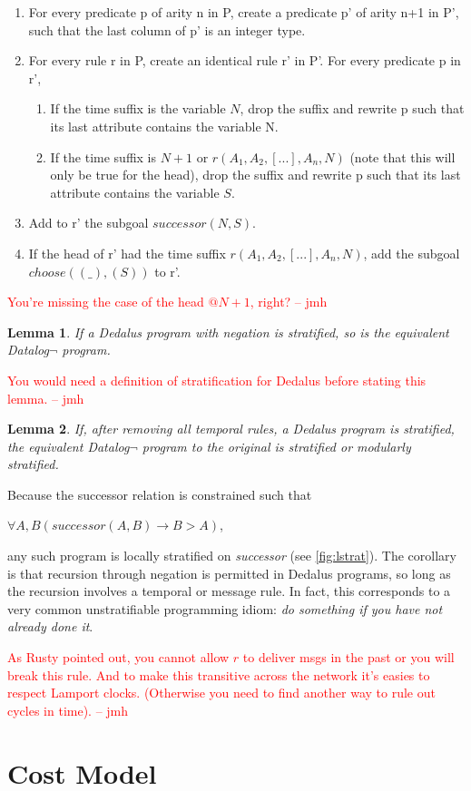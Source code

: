 \documentclass{acm_proc_article-sp-sigmod09}
\newcommand{\jmh}[1]{{\textcolor{red}{#1 -- jmh}}}
\begin{document}
\begin{enumerate}
\item For every predicate p of arity n in P, create a predicate p' of arity n+1 in P', such that the last column of p' is an integer type.
\item For every rule r in P, create an identical rule r' in P'.  For every predicate p in r',  
\begin{enumerate}
	\item If the time suffix is the variable $N$, drop the suffix and rewrite p such that its last attribute contains the variable N.
	\item If the time suffix is $N+1$ or $r(A_{1}, A_{2},[...], A_{n},N)$ (note that this will only be true for the head), drop the suffix
	and rewrite p such that its last attribute contains the variable $S$.
\end{enumerate}
\item Add to r' the subgoal $successor(N, S)$.
\item If the head of r' had the time suffix  $r(A_{1}, A_{2},[...], A_{n},N)$, add the subgoal $choose((\_), (S))$ to r'.

\end{enumerate}
\jmh{You're missing the case of the head $@N+1$, right?}

\newtheorem{lemma}{Lemma}
\begin{lemma}
If a Dedalus program with negation is stratified, so is the equivalent Datalog$\lnot$ program.
\end{lemma}
\jmh{You would need a definition of stratification for Dedalus before stating this lemma.}

\begin{lemma}
If, after removing all temporal rules, a Dedalus program is stratified, the equivalent Datalog$\lnot$ program to the original
is stratified or modularly stratified.
\end{lemma}

 Because the successor relation is constrained
such that 

$\forall A,B (successor(A, B) \rightarrow B > A)$, 

any such program is locally stratified on \emph{successor} (see \ref{fig:lstrat}).  
The corollary is that recursion through negation
is permitted in Dedalus programs, so long as the recursion involves a temporal or message rule.
In fact, this corresponds to a very common unstratifiable programming idiom: \emph{do something
if you have not already done it}.

\jmh{As Rusty pointed out, you cannot allow $r$ to deliver msgs in the past or you will break this rule.  And to make this transitive across the network it's easies to respect Lamport clocks. (Otherwise you need to find another way to rule out cycles in time).}

\section{Cost Model}
\end{document}
